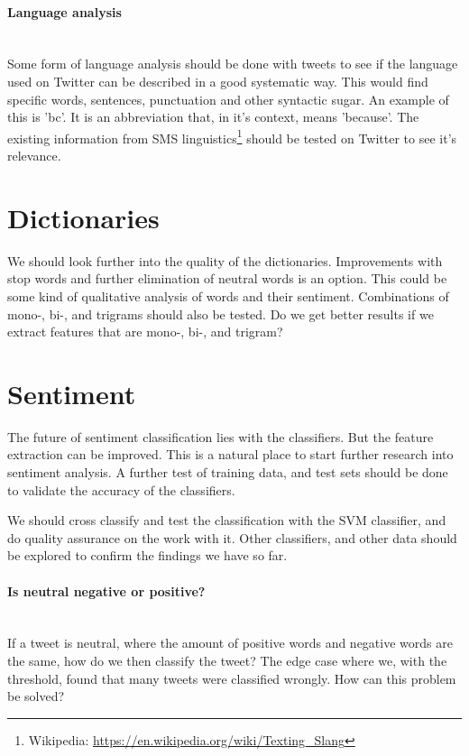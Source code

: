 \paragraph{Language analysis}
\hspace{0pt}\\
Some form of language analysis should be done with tweets to see if the
language used on Twitter can be described in a good systematic way. This would
find specific words, sentences, punctuation and other syntactic sugar. 
An example of this is 'bc'. It is an abbreviation that, in it's
context, means 'because'. The existing information from SMS
linguistics\footnote{Wikipedia:
\url{https://en.wikipedia.org/wiki/Texting_Slang}} should be
tested on Twitter to see it's relevance. 
%

\section{Dictionaries}\label{future_work:dictionaries}
We should look further into the quality of the dictionaries. Improvements with
stop words and further elimination of neutral words is an option. This
could be some kind of qualitative analysis of words and their sentiment.
Combinations of mono-, bi-, and trigrams should also be tested. Do we get better
results if we extract features that are mono-, bi-, and trigram? 
%

\section{Sentiment}\label{future_work:sentiment}
The future of sentiment classification lies with the classifiers. But the
feature extraction can be improved. This is a natural place to start further
research into sentiment analysis. A further test of training data, and test sets
should be done to validate the accuracy of the classifiers.   

We should cross classify and test the classification with the SVM classifier,
and do quality assurance on the work with it.
Other classifiers, and other data should be explored to confirm the findings we
have so far. 
 
\paragraph{Is neutral negative or positive?}
\hspace{0pt}\\
If a tweet is neutral, where the amount of positive words and
negative words are the same, how do we then classify the tweet? The edge case
where we, with the threshold, found that many tweets were classified wrongly.
How can this problem be solved?

